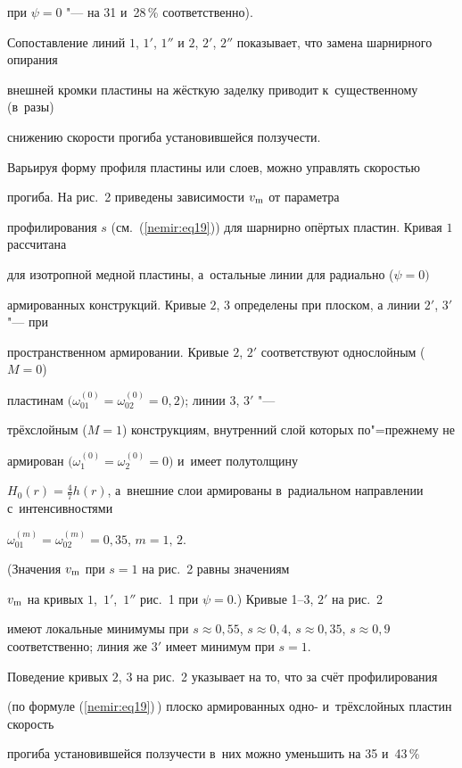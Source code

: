 при $\psi = 0$ "--- на 31 и~28\,{\%} соответственно).



Сопоставление линий $1$, $1'$, $ 1''$ и $2$, $2'$, $ 2''$ показывает, что замена шарнирного опирания 

внешней кромки пластины на жёсткую заделку приводит к~существенному (в~разы) 

снижению скорости прогиба установившейся ползучести.



Варьируя форму профиля пластины или слоев, можно управлять скоростью 

прогиба. На рис.~2 приведены зависимости $v_{\rm m} $ от параметра 

профилирования $s$ (см.~(\ref{nemir:eq19})) для шарнирно опёртых пластин. Кривая $1$ рассчитана 

для изотропной медной пластины, а~остальные линии для радиально ($\psi = 0)$ 

армированных конструкций. Кривые $2$, $3$ определены при плоском, а линии $2'$, $3'$ "--- при 

пространственном армировании. Кривые $2$, $2'$ соответствуют однослойным ($M = 0$) 

пластинам $\bigl(\omega _{01}^{(0)} = \omega _{02}^{(0)} = 0,2\bigr)$; линии $3$, $3'$ "--- 

трёхслойным ($M = 1$) конструкциям, внутренний слой которых по"=прежнему не 

армирован $\bigl(\omega _1^{(0)} = \omega _2^{(0)} = 0\bigr)$ и~имеет полутолщину 

$H_0 (r) = \frac 47h(r)$, а~внешние слои армированы в~радиальном направлении с~интенсивностями 

$\omega _{01}^{(m)} = \omega _{02}^{(m)} = 0,35$, $m = 1,\,2$. 

(Значения $v_{\rm m} $ при $s = 1$ на рис.~2 равны значениям 

$v_{\rm m} $ на кри\-вых $1$,~$1'$,~$ 1''$ рис.~1 при $\psi = 0$.) Кривые 1--3, $2'$ на рис.~2 

имеют локальные минимумы при $s \approx 0,55$, $s \approx 0,4$, $s \approx 0,35$, $s \approx 0,9$ соответственно; линия же $3'$ имеет минимум при $s = 1$. 

Поведение кривых $2$, $3$ на рис.~2 указывает на то, что за счёт профилирования 

(по формуле (\ref{nemir:eq19})\,) плоско армированных одно- и~трёхслойных пластин скорость 

прогиба установившейся ползучести в~них можно уменьшить на 35 и~43\,{\%} 

